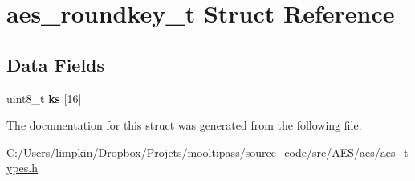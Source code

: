 \hypertarget{structaes__roundkey__t}{\section{aes\+\_\+roundkey\+\_\+t Struct Reference}
\label{structaes__roundkey__t}
}
\subsection*{Data Fields}
\begin{DoxyCompactItemize}
\item 
\hypertarget{structaes__roundkey__t_a9289449e3402751c6996e0c14c3750b8}{uint8\+\_\+t {\bfseries ks} \mbox{[}16\mbox{]}}\label{structaes__roundkey__t_a9289449e3402751c6996e0c14c3750b8}

\end{DoxyCompactItemize}


The documentation for this struct was generated from the following file\+:\begin{DoxyCompactItemize}
\item 
C\+:/\+Users/limpkin/\+Dropbox/\+Projets/mooltipass/source\+\_\+code/src/\+A\+E\+S/aes/\hyperlink{aes__types_8h}{aes\+\_\+types.\+h}\end{DoxyCompactItemize}
